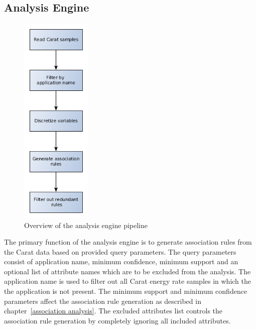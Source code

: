 \subsection{Analysis Engine}

\begin{figure}
	\vspace{-110pt}
	\begin{center}
		\includegraphics[width=0.3\textwidth]{images/analysis_engine_flow_graph.png}
	\end{center}
	\caption{Overview of the analysis engine pipeline}
	\label{figure:analysis-engine-flow-graph}
\end{figure}

The primary function of the analysis engine is to generate association rules from the Carat data based on provided query parameters. The query parameters consist of application name, minimum confidence, minimum support and an optional list of attribute names which are to be excluded from the analysis. The application name is used to filter out all Carat energy rate samples in which the the application is not present. The minimum support and minimum confidence parameters affect the association rule generation as described in chapter~\ref{association analysis}. The excluded attributes list controls the association rule generation by completely ignoring all included attributes.    

 

